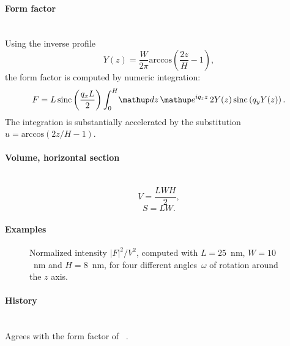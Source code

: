 \paragraph{Form factor}\strut\\
Using the inverse profile
\begin{equation*}
  Y(z) = \frac{W}{2\pi}\text{arccos}\left( \frac{2z}{H}-1 \right),
\end{equation*}
the form factor is computed by numeric integration:
\begin{equation*}
F = L \sinc\left(\frac{q_xL}{2}\right)
   \int_0^H\!\d z\,\e^{iq_zz}\, 2Y(z)\sinc\left(q_y Y(z)\right).
\end{equation*}
The integration is substantially accelerated by the substitution
$u=\text{arccos}( 2z/H-1)$.

\paragraph{Volume, horizontal section}\strut\\
\begin{equation*}
  V = \dfrac{L W H}{2},
\end{equation*}
\begin{equation*}
  S = L W.
\end{equation*}

\paragraph{Examples}\strut

\begin{figure}[H]
\begin{center}
\end{center}
\caption{Normalized intensity $|F|^2/V^2$,
computed with $L=25$~nm, $W=10$~nm and $H=8$~nm,
for four different angles~$\omega$ of rotation around the $z$ axis.}
\end{figure}

\paragraph{History}\strut\\
Agrees with the  form factor of \FitGISAXS\ \cite{Bab13}.

 \label{SRipple2}

